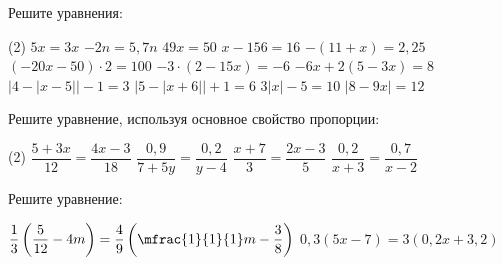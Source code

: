 \begin{homework}[number=2]
	\begin{listofex}
		\item Решите уравнения: %
		\begin{tasks}(2)
			\task \( 5x=3x \)
			\task \( -2n=5,7n \)
			\task \( 49x=50 \)
			\task \( x-156=16 \)
			\task \( -(11+x)=2,25 \)
			\task \( (-20x-50)\cdot 2 = 100 \)
			\task \( -3 \cdot (2-15x) = -6 \)
			\task \( -6x+2(5-3x)=8 \)
			\task \( |4-|x-5||-1=3 \)
			\task \( |5-|x+6||+1=6 \)
			\task \( 3|x|-5=10 \)
			\task \( |8-9x|=12 \)
		\end{tasks}
		\item Решите уравнение, используя основное свойство пропорции:
		\begin{tasks}(2)
			\task \( \dfrac{5+3x}{12} = \dfrac{4x-3}{18} \)
			\task \( \dfrac{0,9}{7+5y} = \dfrac{0,2}{y-4} \)
			\task \( \dfrac{x+7}{3} = \dfrac{2x-3}{5} \)
			\task \( \dfrac{0,2}{x+3} = \dfrac{0,7}{x-2} \)
		\end{tasks}
		\item Решите уравнение: %
		\begin{tasks}
			\task \( \dfrac{1}{3} \left( \dfrac{5}{12}-4m \right) =\dfrac{4}{9} \left(  \mfrac{1}{1}{1} m-\dfrac{3}{8} \right) \)
			\task \( 0,3(5x-7)=3(0,2x+3,2) \)
		\end{tasks}
	\end{listofex}
\end{homework}

